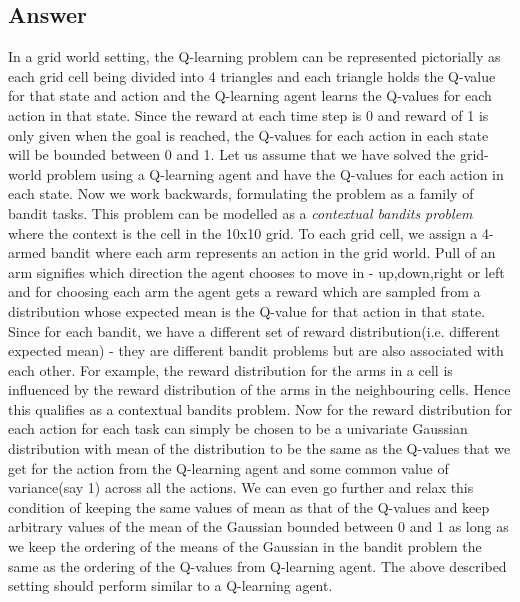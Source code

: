 \documentclass[english]{article}
\begin{document}
\subsection{Answer}
In a grid world setting, the Q-learning problem can be represented pictorially as each grid cell being divided into 4 triangles and each triangle holds the Q-value for that state and action and the Q-learning agent learns the Q-values for each action in that state. Since the reward at each time step is 0 and reward of 1 is only given when the goal is reached, the Q-values for each action in each state will be bounded between 0 and 1. Let us assume that we have solved the grid-world problem using a Q-learning agent and have the Q-values for each action in each state. Now we work backwards, formulating the problem as a family of bandit tasks.
\newline
\newline
This problem can be modelled as a \emph{contextual bandits problem} where the context is the cell in the 10x10 grid. To each grid cell, we assign a 4-armed bandit where each arm represents an action in the grid world. Pull of an arm signifies which direction the agent chooses to move in - up,down,right or left and for choosing each arm the agent gets a reward which are sampled from a distribution whose expected mean is the Q-value for that action in that state. Since for each bandit, we have a different set of reward distribution(i.e. different expected mean) - they are different bandit problems but are also associated with each other. For example, the reward distribution for the arms in a cell is influenced by the reward distribution of the arms in the neighbouring cells. Hence this qualifies as a contextual bandits problem. 
\newline
\newline
Now for the reward distribution for each action for each task can simply be chosen to be a univariate Gaussian distribution with mean of the distribution to be the same as the Q-values that we get for the action from the Q-learning agent and some common value of variance(say 1) across all the actions. We can even go further and relax this condition of keeping the same values of mean as that of the Q-values and keep arbitrary values of the mean of the Gaussian bounded between 0 and 1 as long as we keep the ordering of the means of the Gaussian in the bandit problem the same as the ordering of the Q-values from Q-learning agent. 
\newline
\newline
The above described setting should perform similar to a Q-learning agent.
\end{document}
